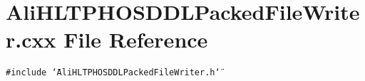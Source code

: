 \section{Ali\-HLTPHOSDDLPacked\-File\-Writer.cxx File Reference}
\label{AliHLTPHOSDDLPackedFileWriter_8cxx}


{\tt \#include \char`\"{}Ali\-HLTPHOSDDLPacked\-File\-Writer.h\char`\"{}}\par
